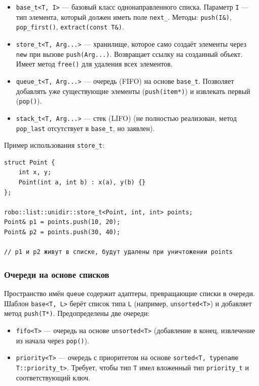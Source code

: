 \documentclass[a4paper,12pt]{article}
\begin{document}
\begin{itemize}
    \item \texttt{base\_t<T, I>} — базовый класс однонаправленного списка. Параметр \texttt{I} — тип элемента, который должен иметь поле \texttt{next\_}. Методы: \texttt{push(I\&)}, \texttt{pop\_first()}, \texttt{extract(const T\&)}.
    \item \texttt{store\_t<T, Arg...>} — хранилище, которое само создаёт элементы через \texttt{new} при вызове \texttt{push(Arg...)}. Возвращает ссылку на созданный объект. Имеет метод \texttt{free()} для удаления всех элементов.
    \item \texttt{queue\_t<T, Arg...>} — очередь (FIFO) на основе \texttt{base\_t}. Позволяет добавлять уже существующие элементы (\texttt{push(item*)}) и извлекать первый (\texttt{pop()}).
    \item \texttt{stack\_t<T, Arg...>} — стек (LIFO) (не полностью реализован, метод \texttt{pop\_last} отсутствует в \texttt{base\_t}, но заявлен).
\end{itemize}

Пример использования \texttt{store\_t}:

\begin{lstlisting}[caption={Хранилище объектов}]
struct Point {
    int x, y;
    Point(int a, int b) : x(a), y(b) {}
};

robo::list::unidir::store_t<Point, int, int> points;
Point& p1 = points.push(10, 20);
Point& p2 = points.push(30, 40);

// p1 и p2 живут в списке, будут удалены при уничтожении points
\end{lstlisting}

\subsubsection{Очереди на основе списков}

Пространство имён \texttt{queue} содержит адаптеры, превращающие списки в очереди. Шаблон \texttt{base<T, L>} берёт список типа \texttt{L} (например, \texttt{unsorted<T>}) и добавляет метод \texttt{push(T*)}. Предопределены две очереди:

\begin{itemize}
    \item \texttt{fifo<T>} — очередь на основе \texttt{unsorted<T>} (добавление в конец, извлечение из начала через \texttt{pop()}).
    \item \texttt{priority<T>} — очередь с приоритетом на основе \texttt{sorted<T, typename T::priority\_t>}. Требует, чтобы тип \texttt{T} имел вложенный тип \texttt{priority\_t} и соответствующий ключ.
\end{itemize}
\end{document}
